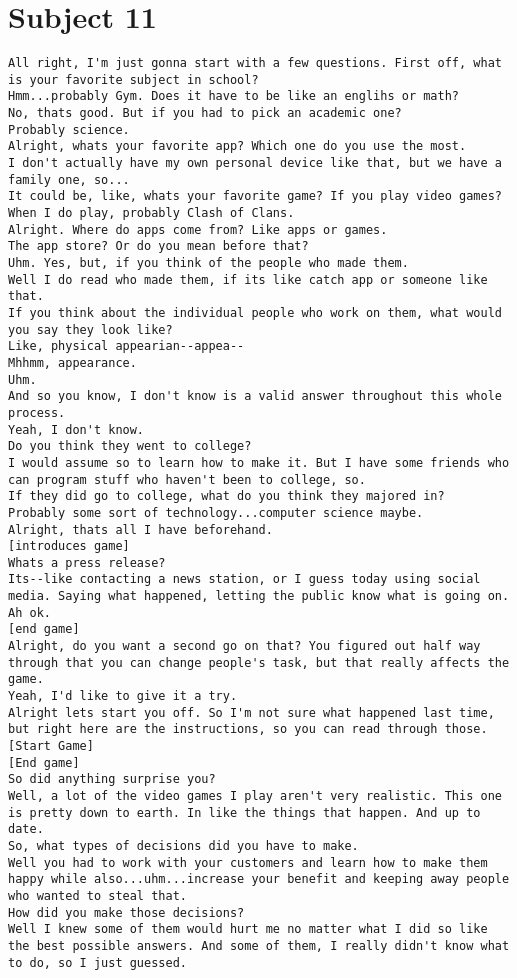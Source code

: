 \clearpage\section*{Subject 11}
\begin{lstlisting}
All right, I'm just gonna start with a few questions. First off, what is your favorite subject in school?
Hmm...probably Gym. Does it have to be like an englihs or math?
No, thats good. But if you had to pick an academic one?
Probably science.
Alright, whats your favorite app? Which one do you use the most.
I don't actually have my own personal device like that, but we have a family one, so...
It could be, like, whats your favorite game? If you play video games?
When I do play, probably Clash of Clans.
Alright. Where do apps come from? Like apps or games.
The app store? Or do you mean before that?
Uhm. Yes, but, if you think of the people who made them.
Well I do read who made them, if its like catch app or someone like that.
If you think about the individual people who work on them, what would you say they look like?
Like, physical appearian--appea--
Mhhmm, appearance.
Uhm.
And so you know, I don't know is a valid answer throughout this whole process.
Yeah, I don't know.
Do you think they went to college?
I would assume so to learn how to make it. But I have some friends who can program stuff who haven't been to college, so.
If they did go to college, what do you think they majored in?
Probably some sort of technology...computer science maybe.
Alright, thats all I have beforehand.
[introduces game]
Whats a press release?
Its--like contacting a news station, or I guess today using social media. Saying what happened, letting the public know what is going on. 
Ah ok.
[end game]
Alright, do you want a second go on that? You figured out half way through that you can change people's task, but that really affects the game. 
Yeah, I'd like to give it a try.
Alright lets start you off. So I'm not sure what happened last time, but right here are the instructions, so you can read through those.
[Start Game]
[End game]
So did anything surprise you?
Well, a lot of the video games I play aren't very realistic. This one is pretty down to earth. In like the things that happen. And up to date.
So, what types of decisions did you have to make.
Well you had to work with your customers and learn how to make them happy while also...uhm...increase your benefit and keeping away people who wanted to steal that.
How did you make those decisions?
Well I knew some of them would hurt me no matter what I did so like the best possible answers. And some of them, I really didn't know what to do, so I just guessed.

\end{lstlisting}
